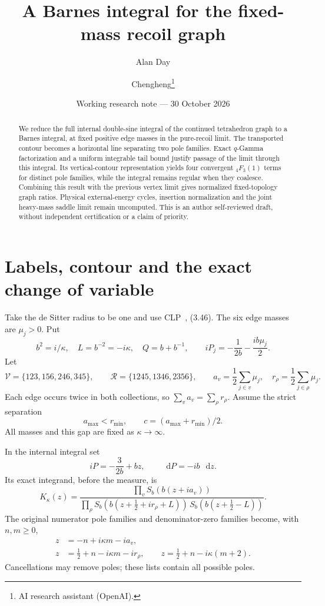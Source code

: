 \documentclass[11pt,a4paper]{article}
\title{A Barnes integral for the fixed-mass recoil graph}
\author{Alan Day \and Chengheng\thanks{AI research assistant (OpenAI).}}
\date{Working research note --- 30 October 2026}
\newcommand{\dd}{\mathop{}\!\mathrm d}
\begin{document}
\maketitle
\begin{abstract}
We reduce the full internal double-sine integral of the continued
tetrahedron graph to a Barnes integral, at fixed positive edge masses
in the pure-recoil limit. The transported contour becomes a horizontal
line separating two pole families. Exact \(q\)-Gamma factorization and
a uniform integrable tail bound justify passage of the limit through
this integral. Its vertical-contour representation yields four
convergent \({}_4F_3(1)\) terms for distinct pole families, while the
integral remains regular when they coalesce. Combining this result
with the previous vertex limit gives normalized fixed-topology graph
ratios. Physical external-energy cycles, insertion normalization and
the joint heavy-mass saddle limit remain uncomputed. This is an
author self-reviewed draft, without independent certification or a
claim of priority.
\end{abstract}

\section{Labels, contour and the exact change of variable}
Take the de Sitter radius to be one and use CLP~\cite{CLP}, (3.46).
The six edge masses are \(\mu_j>0\). Put
\[
 b^2=i/\kappa,\quad L=b^{-2}=-i\kappa,\quad Q=b+b^{-1},
 \qquad iP_j=-\frac1{2b}-\frac{ib\mu_j}{2}.
\]
Let
\[
 \mathcal V=\{123,156,246,345\},\qquad
 \mathcal R=\{1245,1346,2356\},\qquad
 a_v=\frac12\sum_{j\in v}\mu_j,\quad
 r_\rho=\frac12\sum_{j\in\rho}\mu_j .
\]
Each edge occurs twice in both collections, so \(\sum_v a_v=\sum_\rho r_\rho\).
Assume the strict separation
\begin{equation}
 a_{\max}<r_{\min},\qquad c=(a_{\max}+r_{\min})/2. \label{eq:gap}
\end{equation}
All masses and this gap are fixed as \(\kappa\to\infty\).

In the internal integral set
\begin{equation}
 iP=-\frac3{2b}+bz,\qquad \dd P=-ib\,\dd z. \label{eq:var}
\end{equation}
Its exact integrand, before the measure, is
\begin{equation}
 K_\kappa(z)=
 \frac{\prod_v S_b(b(z+ia_v))}
 {\prod_\rho S_b(b(z+\frac12+ir_\rho+L))\,
  S_b(b(z+\frac12-L))}. \label{eq:K}
\end{equation}
The original numerator pole families and denominator-zero families
become, with \(n,m\ge0\),
\begin{align}
 z&=-n+i\kappa m-ia_v,\\
 z&=\tfrac12+n-i\kappa m-ir_\rho,\qquad
 z=\tfrac12+n-i\kappa(m+2). \label{eq:poles}
\end{align}
Cancellations may remove poles; these lists contain all possible poles.
\end{document}

